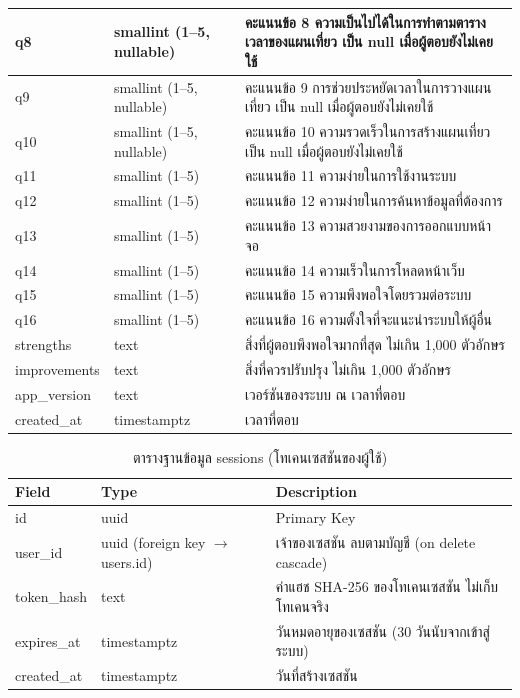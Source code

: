 \begin{longtable}{|p{3.6cm}|p{2.6cm}|p{6.8cm}|}
q8 & smallint (1--5, nullable) & คะแนนข้อ 8 ความเป็นไปได้ในการทำตามตารางเวลาของแผนเที่ยว เป็น null เมื่อผู้ตอบยังไม่เคยใช้ \\ \hline
q9 & smallint (1--5, nullable) & คะแนนข้อ 9 การช่วยประหยัดเวลาในการวางแผนเที่ยว เป็น null เมื่อผู้ตอบยังไม่เคยใช้ \\ \hline
q10 & smallint (1--5, nullable) & คะแนนข้อ 10 ความรวดเร็วในการสร้างแผนเที่ยว เป็น null เมื่อผู้ตอบยังไม่เคยใช้ \\ \hline
q11 & smallint (1--5) & คะแนนข้อ 11 ความง่ายในการใช้งานระบบ \\ \hline
q12 & smallint (1--5) & คะแนนข้อ 12 ความง่ายในการค้นหาข้อมูลที่ต้องการ \\ \hline
q13 & smallint (1--5) & คะแนนข้อ 13 ความสวยงามของการออกแบบหน้าจอ \\ \hline
q14 & smallint (1--5) & คะแนนข้อ 14 ความเร็วในการโหลดหน้าเว็บ \\ \hline
q15 & smallint (1--5) & คะแนนข้อ 15 ความพึงพอใจโดยรวมต่อระบบ \\ \hline
q16 & smallint (1--5) & คะแนนข้อ 16 ความตั้งใจที่จะแนะนำระบบให้ผู้อื่น \\ \hline
strengths & text & สิ่งที่ผู้ตอบพึงพอใจมากที่สุด ไม่เกิน 1,000 ตัวอักษร \\ \hline
improvements & text & สิ่งที่ควรปรับปรุง ไม่เกิน 1,000 ตัวอักษร \\ \hline
app\_version & text & เวอร์ชันของระบบ ณ เวลาที่ตอบ \\ \hline
created\_at & timestamptz & เวลาที่ตอบ \\
\hline
\end{longtable}


\begin{table}[H]
\centering
\caption{ตารางฐานข้อมูล sessions (โทเคนเซสชันของผู้ใช้)}
\label{tab:db_sessions}
\begin{tabular}{|p{3.6cm}|p{2.6cm}|p{6.8cm}|}
\hline
\textbf{Field} & \textbf{Type} & \textbf{Description} \\
\hline
id & uuid & Primary Key \\ \hline
user\_id & uuid (foreign key $\to$ users.id) & เจ้าของเซสชัน ลบตามบัญชี (on delete cascade) \\ \hline
token\_hash & text & ค่าแฮช SHA-256 ของโทเคนเซสชัน ไม่เก็บโทเคนจริง \\ \hline
expires\_at & timestamptz & วันหมดอายุของเซสชัน (30 วันนับจากเข้าสู่ระบบ) \\ \hline
created\_at & timestamptz & วันที่สร้างเซสชัน \\
\hline
\end{tabular}
\end{table}

